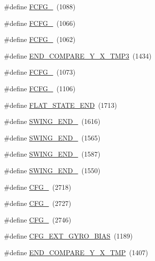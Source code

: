 \begin{DoxyCompactItemize}
\item 
\#define \hyperlink{group___d_r_i_v_e_r_s_ga68df22b3699418acab9063ee5f996d8e}{F\+C\+F\+G\+\_}~(1088)
\item 
\#define \hyperlink{group___d_r_i_v_e_r_s_gac0e79063d1a071c1a8bd3f7081e4299e}{F\+C\+F\+G\+\_}~(1066)
\item 
\#define \hyperlink{group___d_r_i_v_e_r_s_ga9a7d63d6add8f9fdf9edc722a01aeb92}{F\+C\+F\+G\+\_}~(1062)
\item 
\#define \hyperlink{group___d_r_i_v_e_r_s_ga3658f219d52dff5022cc499a747ca589}{E\+N\+D\+\_\+\+C\+O\+M\+P\+A\+R\+E\+\_\+\+Y\+\_\+\+X\+\_\+\+T\+M\+P3}~(1434)
\item 
\#define \hyperlink{group___d_r_i_v_e_r_s_ga687777b4390e4a84ac774cf0600abe20}{F\+C\+F\+G\+\_}~(1073)
\item 
\#define \hyperlink{group___d_r_i_v_e_r_s_ga2ba17b85493f082e37d7e57f45200144}{F\+C\+F\+G\+\_}~(1106)
\item 
\#define \hyperlink{group___d_r_i_v_e_r_s_ga5c1ebd0914bd0e30766c9cbcc25c31c5}{F\+L\+A\+T\+\_\+\+S\+T\+A\+T\+E\+\_\+\+E\+ND}~(1713)
\item 
\#define \hyperlink{group___d_r_i_v_e_r_s_gaa6efdc55c49bd242ffafb9a9b227cca8}{S\+W\+I\+N\+G\+\_\+\+E\+N\+D\+\_}~(1616)
\item 
\#define \hyperlink{group___d_r_i_v_e_r_s_ga8a156eab56c25c1f9156a2751fa2155d}{S\+W\+I\+N\+G\+\_\+\+E\+N\+D\+\_}~(1565)
\item 
\#define \hyperlink{group___d_r_i_v_e_r_s_ga3ff31c1255dc1fceb7c590bc7f0b3ab0}{S\+W\+I\+N\+G\+\_\+\+E\+N\+D\+\_}~(1587)
\item 
\#define \hyperlink{group___d_r_i_v_e_r_s_ga6f4579a77f23d509cd63d4506e44fa23}{S\+W\+I\+N\+G\+\_\+\+E\+N\+D\+\_}~(1550)
\item 
\#define \hyperlink{group___d_r_i_v_e_r_s_ga3dc0e5c81e361fb871fbf63eeba82520}{C\+F\+G\+\_}~(2718)
\item 
\#define \hyperlink{group___d_r_i_v_e_r_s_ga1fe6e4489855269e7197beb38b07c723}{C\+F\+G\+\_}~(2727)
\item 
\#define \hyperlink{group___d_r_i_v_e_r_s_ga7e9d5deadbd595432b6319178d573cd3}{C\+F\+G\+\_}~(2746)
\item 
\#define \hyperlink{group___d_r_i_v_e_r_s_ga63971727875ac02e2ce6632bd3f82bc2}{C\+F\+G\+\_\+\+E\+X\+T\+\_\+\+G\+Y\+R\+O\+\_\+\+B\+I\+AS}~(1189)
\item 
\#define \hyperlink{group___d_r_i_v_e_r_s_gae9f800bcc27bb65de184d1dbe9c0ce24}{E\+N\+D\+\_\+\+C\+O\+M\+P\+A\+R\+E\+\_\+\+Y\+\_\+\+X\+\_\+\+T\+MP}~(1407)

\end{DoxyCompactItemize}
